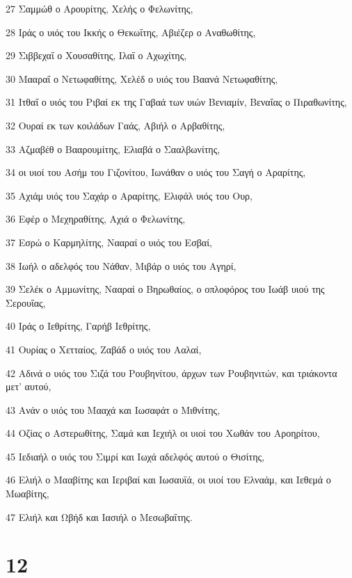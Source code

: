 \par 27 Σαμμώθ ο Αρουρίτης, Χελής ο Φελωνίτης,
\par 28 Ιράς ο υιός του Ικκής ο Θεκωΐτης, Αβιέζερ ο Αναθωθίτης,
\par 29 Σιββεχαΐ ο Χουσαθίτης, Ιλαΐ ο Αχωχίτης,
\par 30 Μααραΐ ο Νετωφαθίτης, Χελέδ ο υιός του Βαανά Νετωφαθίτης,
\par 31 Ιτθαΐ ο υιός του Ριβαί εκ της Γαβαά των υιών Βενιαμίν, Βεναΐας ο Πιραθωνίτης,
\par 32 Ουραί εκ των κοιλάδων Γαάς, Αβιήλ ο Αρβαθίτης,
\par 33 Αζμαβέθ ο Βααρουμίτης, Ελιαβά ο Σααλβωνίτης,
\par 34 οι υιοί του Ασήμ του Γιζονίτου, Ιωνάθαν ο υιός του Σαγή ο Αραρίτης,
\par 35 Αχιάμ υιός του Σαχάρ ο Αραρίτης, Ελιφάλ υιός του Ουρ,
\par 36 Εφέρ ο Μεχηραθίτης, Αχιά ο Φελωνίτης,
\par 37 Εσρώ ο Καρμηλίτης, Νααραί ο υιός του Εσβαί,
\par 38 Ιωήλ ο αδελφός του Νάθαν, Μιβάρ ο υιός του Αγηρί,
\par 39 Σελέκ ο Αμμωνίτης, Νααραί ο Βηρωθαίος, ο οπλοφόρος του Ιωάβ υιού της Σερουΐας,
\par 40 Ιράς ο Ιεθρίτης, Γαρήβ Ιεθρίτης,
\par 41 Ουρίας ο Χετταίος, Ζαβάδ ο υιός του Ααλαί,
\par 42 Αδινά ο υιός του Σιζά του Ρουβηνίτου, άρχων των Ρουβηνιτών, και τριάκοντα μετ' αυτού,
\par 43 Ανάν ο υιός του Μααχά και Ιωσαφάτ ο Μιθνίτης,
\par 44 Οζίας ο Αστερωθίτης, Σαμά και Ιεχιήλ οι υιοί του Χωθάν του Αροηρίτου,
\par 45 Ιεδιαήλ ο υιός του Σιμρί και Ιωχά αδελφός αυτού ο Θισίτης,
\par 46 Ελιήλ ο Μααβίτης και Ιεριβαί και Ιωσαυϊά, οι υιοί του Ελναάμ, και Ιεθεμά ο Μωαβίτης,
\par 47 Ελιήλ και Ωβήδ και Ιασιήλ ο Μεσωβαΐτης.

\chapter{12}

